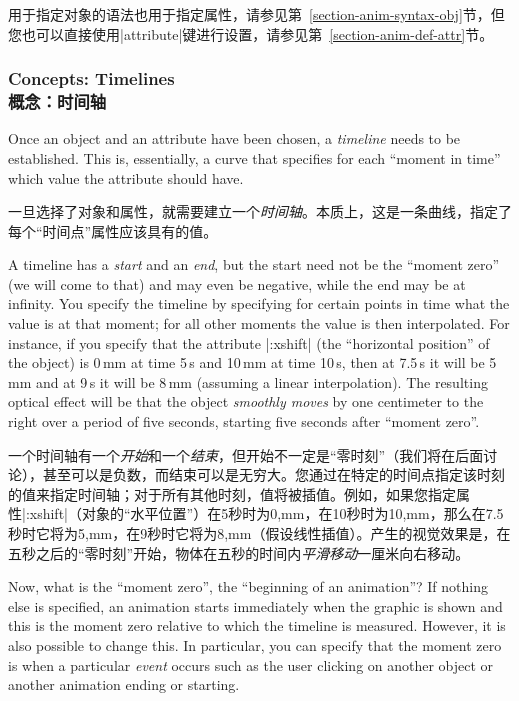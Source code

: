 用于指定对象的语法也用于指定属性，请参见第~\ref{section-anim-syntax-obj}节，但您也可以直接使用|attribute|键进行设置，请参见第~\ref{section-anim-def-attr}节。


\subsubsection{Concepts: Timelines\\概念：时间轴}

Once an object and an attribute have been chosen, a \emph{timeline} needs to be
established. This is, essentially, a curve that specifies for each ``moment in
time'' which value the attribute should have.

一旦选择了对象和属性，就需要建立一个\emph{时间轴}。本质上，这是一条曲线，指定了每个“时间点”属性应该具有的值。

A timeline has a \emph{start} and an \emph{end}, but the start need not be the
``moment zero'' (we will come to that) and may even be negative, while the end
may be at infinity. You specify the timeline by specifying for certain points
in time what the value is at that moment; for all other moments the value is
then interpolated. For instance, if you specify that the attribute |:xshift|
(the ``horizontal position'' of the object) is 0\,mm at time 5\,s and 10\,mm at
time 10\,s, then at 7.5\,s it will be 5\,mm and at 9\,s it will be 8\,mm
(assuming a linear interpolation). The resulting optical effect will be that
the object \emph{smoothly moves} by one centimeter to the right over a period
of five seconds, starting five seconds after ``moment zero''.

一个时间轴有一个\emph{开始}和一个\emph{结束}，但开始不一定是``零时刻''（我们将在后面讨论），甚至可以是负数，而结束可以是无穷大。您通过在特定的时间点指定该时刻的值来指定时间轴；对于所有其他时刻，值将被插值。例如，如果您指定属性|:xshift|（对象的“水平位置”）在5秒时为0,mm，在10秒时为10,mm，那么在7.5秒时它将为5,mm，在9秒时它将为8,mm（假设线性插值）。产生的视觉效果是，在五秒之后的“零时刻”开始，物体在五秒的时间内\emph{平滑移动}一厘米向右移动。

Now, what is the ``moment zero'', the ``beginning of an animation''? If nothing
else is specified, an animation starts immediately when the graphic is shown
and this is the moment zero relative to which the timeline is measured.
However, it is also possible to change this. In particular, you can specify
that the moment zero is when a particular \emph{event} occurs such as the user
clicking on another object or another animation ending or starting.

